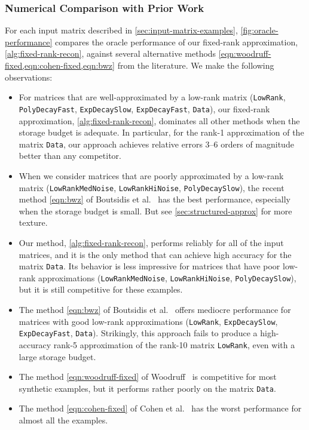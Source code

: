 \documentclass[final]{siamart1116}
\numberwithin{equation}{section}
\numberwithin{theorem}{section}
\numberwithin{figure}{section}
\begin{document}
\subsubsection{Numerical Comparison with Prior Work}

For each input matrix described in \cref{sec:input-matrix-examples},
\cref{fig:oracle-performance} compares the oracle performance of
our fixed-rank approximation, \cref{alg:fixed-rank-recon},
against several alternative methods \cref{eqn:woodruff-fixed,eqn:cohen-fixed,eqn:bwz}
from the literature.  We make the following observations:

\vspace{0.5pc}

\begin{itemize} \setlength{\itemsep}{0.5pc}
\item	For matrices that are well-approximated by a low-rank matrix
(\texttt{LowRank}, \texttt{PolyDecayFast}, \texttt{ExpDecaySlow}, \texttt{ExpDecayFast}, \texttt{Data}),
our fixed-rank approximation, \cref{alg:fixed-rank-recon}, dominates
all other methods when the storage budget is adequate.
In particular, for the rank-1 approximation of the matrix
\texttt{Data}, our approach achieves relative errors 3--6 orders of magnitude
better than any competitor.

\item	When we consider matrices that are poorly approximated by a low-rank matrix
(\texttt{LowRankMedNoise}, \texttt{LowRankHiNoise}, \texttt{PolyDecaySlow}), the recent method \cref{eqn:bwz}
of Boutsidis et al.~\cite[Thm.~12]{BWZ16:Optimal-Principal-STOC} has the best performance, especially when the storage budget is small.
But see \cref{sec:structured-approx} for more texture.


\item	Our method, \cref{alg:fixed-rank-recon}, performs reliably
for all of the input matrices, and it is the only method that can achieve
high accuracy for the matrix \texttt{Data}.  Its behavior is less impressive for matrices that
have poor low-rank approximations (\texttt{LowRankMedNoise}, \texttt{LowRankHiNoise}, \texttt{PolyDecaySlow}),
but it is still competitive for these examples.

\item	The method \cref{eqn:bwz} of Boutsidis et al.~\cite[Thm.~12]{BWZ16:Optimal-Principal-STOC} offers mediocre performance for
matrices with good low-rank approximations (\texttt{LowRank}, \texttt{ExpDecaySlow}, \texttt{ExpDecayFast}, \texttt{Data}).
Strikingly, this approach fails to produce a high-accuracy rank-5 approximation
of the rank-10 matrix \texttt{LowRank}, even with a large storage budget.

\item	The method \cref{eqn:woodruff-fixed} of Woodruff~\cite[Thm.~4.3, display 2]{Woo14:Sketching-Tool}
is competitive for most synthetic examples, but it performs rather poorly on the matrix \texttt{Data}.

\item	The method \cref{eqn:cohen-fixed} of Cohen et al.~\cite[Sec.~10.1]{CEM+15:Dimensionality-Reduction}
has the worst performance for almost all the examples.
\end{itemize}
\end{document}
